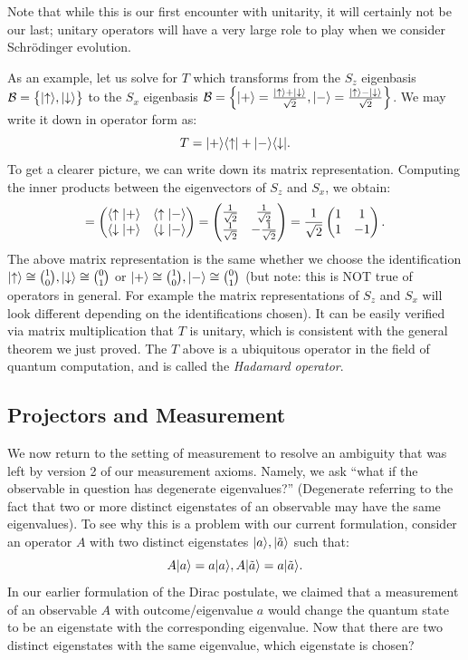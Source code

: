 Note that while this is our first encounter with unitarity, it will certainly not be our last; unitary operators will have a very large role to play when we consider Schr\"{o}dinger evolution.

As an example, let us solve for $T$ which transforms from the $S_z$ eigenbasis $\mathcal{B} = \set{\lvert \uparrow \rangle, \lvert \downarrow \rangle}$ to the $S_x$ eigenbasis $\mathcal{B} = \set{\lvert + \rangle = \frac{\lvert \uparrow \rangle + \lvert \downarrow \rangle}{\sqrt{2}}, \lvert - \rangle = \frac{\lvert \uparrow \rangle - \lvert \downarrow \rangle}{\sqrt{2}}}$. We may write it down in operator form as:
\begin{equation}
    T = \lvert + \rangle \langle \uparrow \rvert + \lvert - \rangle \langle \downarrow \rvert.
\end{equation}
To get a clearer picture, we can write down its matrix representation. Computing the inner products between the eigenvectors of $S_z$ and $S_x$, we obtain: 
\begin{equation}
    [T] = \mat{\braket{\uparrow}{+} & \braket{\uparrow}{-} \\ \braket{\downarrow}{+} & \braket{\downarrow}{-}} = \mat{\frac{1}{\sqrt{2}} & \frac{1}{\sqrt{2}} \\ \frac{1}{\sqrt{2}} & -\frac{1}{\sqrt{2}}} = \frac{1}{\sqrt{2}}\mat{1 & 1 \\ 1 & -1}.
\end{equation}
The above matrix representation is the same whether we choose the identification $\lvert \uparrow \rangle \cong \binom{1}{0}, \lvert \downarrow \rangle \cong \binom{0}{1}$ or $\lvert + \rangle \cong \binom{1}{0}, \lvert - \rangle \cong \binom{0}{1}$ (but note: this is NOT true of operators in general. For example the matrix representations of $S_z$ and $S_x$ will look different depending on the identifications chosen). It can be easily verified via matrix multiplication that $T$ is unitary, which is consistent with the general theorem we just proved. The $T$ above is a ubiquitous operator in the field of quantum computation, and is called the \emph{Hadamard operator}.

\subsection{Projectors and Measurement}
We now return to the setting of measurement to resolve an ambiguity that was left by version 2 of our measurement axioms. Namely, we ask ``what if the observable in question has degenerate eigenvalues?'' (Degenerate referring to the fact that two or more distinct eigenstates of an observable may have the same eigenvalues). To see why this is a problem with our current formulation, consider an operator $A$ with two distinct eigenstates $\lvert a \rangle, \lvert \tilde{a} \rangle$ such that:
\begin{equation}
    A\lvert a \rangle = a\lvert a \rangle, A\lvert \tilde{a} \rangle = a\lvert \tilde{a} \rangle.
\end{equation}
In our earlier formulation of the Dirac postulate, we claimed that a measurement of an observable $A$ with outcome/eigenvalue $a$ would change the quantum state to be an eigenstate with the corresponding eigenvalue. Now that there are two distinct eigenstates with the same eigenvalue, which eigenstate is chosen?

